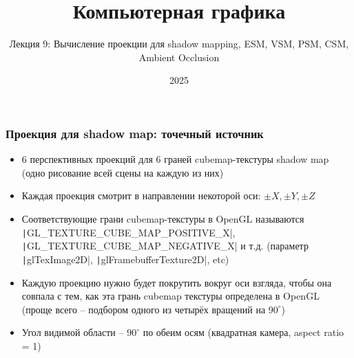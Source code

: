 \documentclass[10pt]{beamer}
\title{Компьютерная графика}
\subtitle{Лекция 9: Вычисление проекции для shadow mapping, ESM, VSM, PSM, CSM, Ambient Occlusion}
\date{2025}
\begin{document}

\frame{\titlepage}

\begin{frame}[fragile]
\frametitle{Проекция для shadow map: точечный источник}
\begin{itemize}
\item 6 перспективных проекций для 6 граней cubemap-текстуры shadow map (одно рисование всей сцены на каждую из них)
\pause
\item Каждая проекция смотрит в направлении некоторой оси: \begin{math}\pm X, \pm Y, \pm Z\end{math}
\pause
\item Соответствующие грани cubemap-текстуры в OpenGL называются \texttt|GL_TEXTURE_CUBE_MAP_POSITIVE_X|, \texttt|GL_TEXTURE_CUBE_MAP_NEGATIVE_X| и т.д. (параметр \texttt|glTexImage2D|, \texttt|glFramebufferTexture2D|, etc)
\pause
\item Каждую проекцию нужно будет покрутить вокруг оси взгляда, чтобы она совпала с тем, как эта грань cubemap текстуры определена в OpenGL (проще всего -- подбором одного из четырёх вращений на \begin{math}90^\circ\end{math})
\pause
\item Угол видимой области -- \begin{math}90^\circ\end{math} по обеим осям (квадратная камера, aspect ratio = 1)
\end{itemize}
\end{frame}
\end{document}
